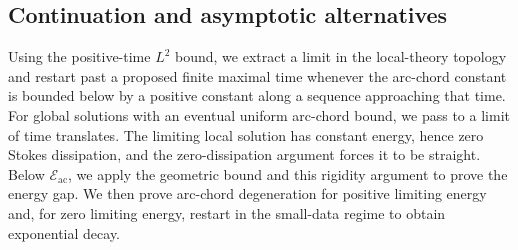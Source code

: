\documentclass[11pt,reqno]{amsart}
\theoremstyle{plain}
\theoremstyle{definition}
\numberwithin{equation}{section}
\newcommand{\mc}[1]{\mathcal{#1}}
\begin{document}
\subsection{Continuation and asymptotic alternatives}
\label{subsec:global-behavior-proof}

Using the positive-time $L^2$ bound, we extract a limit in the local-theory
topology and restart past a proposed finite maximal time whenever the
arc-chord constant is bounded below by a positive constant along a sequence
approaching that time. For global solutions with an eventual uniform
arc-chord bound, we pass to a limit of time translates. The limiting local
solution has constant energy, hence zero Stokes dissipation, and the
zero-dissipation argument forces it to be straight. Below $\mc E_{\mathrm{ac}}$,
we apply the geometric bound and this rigidity argument to prove the energy
gap. We then prove arc-chord degeneration for positive limiting energy and,
for zero limiting energy, restart in the small-data regime to obtain
exponential decay.
\end{document}
